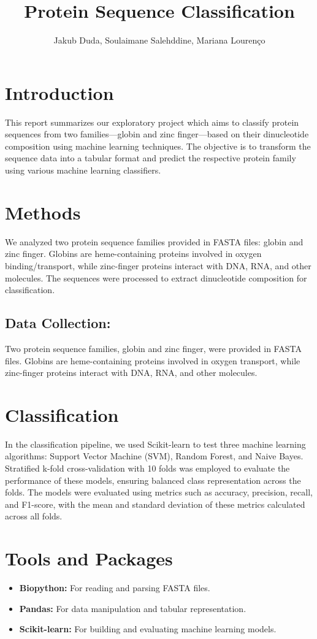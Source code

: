\documentclass{article}
\title{Protein Sequence Classification}
\author{Jakub Duda, Soulaimane Salehddine, Mariana Lourenço}
\begin{document}
\maketitle


\section*{Introduction}
This report summarizes our exploratory project which aims to classify protein sequences from two families—globin and zinc finger—based on their dinucleotide composition using machine learning techniques. The objective is to transform the sequence data into a tabular format and predict the respective protein family using various machine learning classifiers.

\section*{Methods}
We analyzed two protein sequence families provided in FASTA files: globin and zinc finger. Globins are heme-containing proteins involved in oxygen binding/transport, while zinc-finger proteins interact with DNA, RNA, and other molecules. The sequences were processed to extract dinucleotide composition for classification.

\subsection*{Data Collection:}
Two protein sequence families, globin and zinc finger, were provided in FASTA files. Globins are heme-containing proteins involved in oxygen transport, while zinc-finger proteins interact with DNA, RNA, and other molecules.

\section*{Classification}
In the classification pipeline, we used Scikit-learn to test three machine learning algorithms: Support Vector Machine (SVM), Random Forest, and Naive Bayes. Stratified k-fold cross-validation with 10 folds was employed to evaluate the performance of these models, ensuring balanced class representation across the folds. The models were evaluated using metrics such as accuracy, precision, recall, and F1-score, with the mean and standard deviation of these metrics calculated across all folds.

\section*{Tools and Packages}
\begin{itemize}
    \item \textbf{Biopython:} For reading and parsing FASTA files.
    \item \textbf{Pandas:} For data manipulation and tabular representation.
    \item \textbf{Scikit-learn:} For building and evaluating machine learning models.
\end{itemize}
\end{document}
